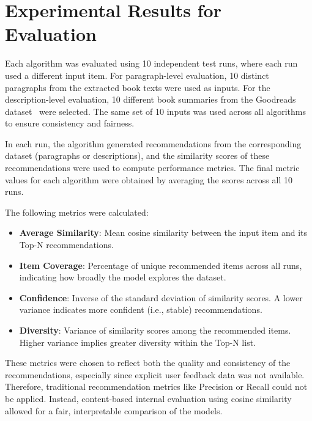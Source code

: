 \documentclass{llncs}
\begin{document}
\section{Experimental Results for Evaluation}

Each algorithm was evaluated using 10 independent test runs, where each run used a different input item. For paragraph-level evaluation, 10 distinct paragraphs from the extracted book texts were used as inputs. For the description-level evaluation, 10 different book summaries from the Goodreads dataset~\cite{goodreads_kumar_2022} were selected. The same set of 10 inputs was used across all algorithms to ensure consistency and fairness.

In each run, the algorithm generated recommendations from the corresponding dataset (paragraphs or descriptions), and the similarity scores of these recommendations were used to compute performance metrics. The final metric values for each algorithm were obtained by averaging the scores across all 10 runs.

The following metrics were calculated:
\begin{itemize}
    \item \textbf{Average Similarity}: Mean cosine similarity between the input item and its Top-N recommendations.
    \item \textbf{Item Coverage}: Percentage of unique recommended items across all runs, indicating how broadly the model explores the dataset.
    \item \textbf{Confidence}: Inverse of the standard deviation of similarity scores. A lower variance indicates more confident (i.e., stable) recommendations.
    \item \textbf{Diversity}: Variance of similarity scores among the recommended items. Higher variance implies greater diversity within the Top-N list.
\end{itemize}

These metrics were chosen to reflect both the quality and consistency of the recommendations, especially since explicit user feedback data was not available. Therefore, traditional recommendation metrics like Precision or Recall could not be applied. Instead, content-based internal evaluation using cosine similarity allowed for a fair, interpretable comparison of the models.
\end{document}
